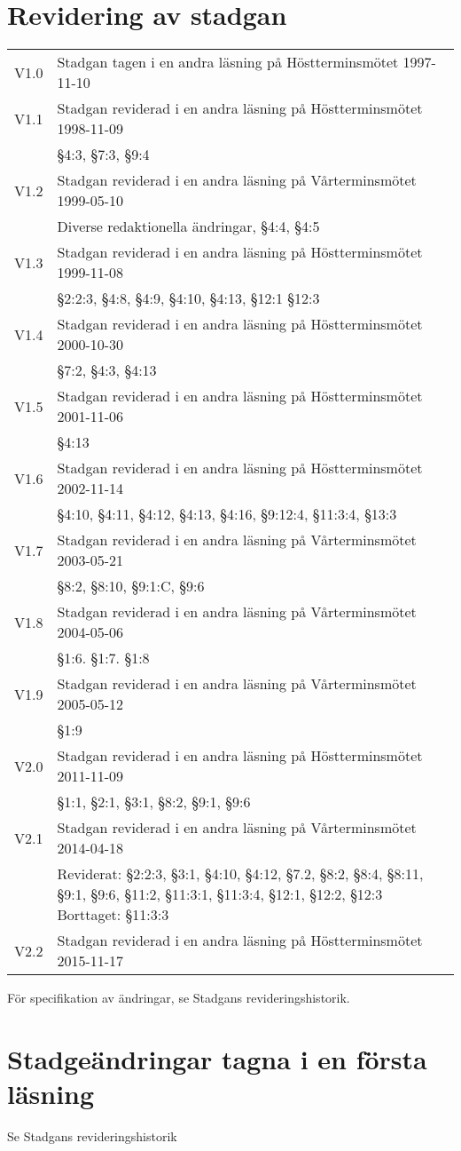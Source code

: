 \documentclass[10pt]{article}
\begin{document}
\newpage
\section*{Revidering av stadgan}

\renewcommand*\arraystretch{1}
\begin{tabular}{p{7mm} p{110mm}}
    V1.0 & Stadgan tagen i en andra läsning på Höstterminsmötet 1997-11-10\\
    V1.1 & Stadgan reviderad i en andra läsning på Höstterminsmötet 1998-11-09\\
    & §4:3, §7:3, §9:4\\
    V1.2 & Stadgan reviderad i en andra läsning på Vårterminsmötet 1999-05-10\\
    & Diverse redaktionella ändringar, §4:4, §4:5 \\
    V1.3 & Stadgan reviderad i en andra läsning på Höstterminsmötet 1999-11-08\\
    & §2:2:3, §4:8, §4:9, §4:10, §4:13, §12:1 §12:3\\
    V1.4 & Stadgan reviderad i en andra läsning på Höstterminsmötet 2000-10-30\\
    & §7:2, §4:3, §4:13\\
    V1.5 & Stadgan reviderad i en andra läsning på Höstterminsmötet 2001-11-06\\
    & §4:13\\
    V1.6 & Stadgan reviderad i en andra läsning på Höstterminsmötet 2002-11-14\\
    & §4:10, §4:11, §4:12, §4:13, §4:16, §9:12:4, §11:3:4, §13:3\\
    V1.7 & Stadgan reviderad i en andra läsning på Vårterminsmötet 2003-05-21\\
    & §8:2, §8:10, §9:1:C, §9:6 \\
    V1.8 & Stadgan reviderad i en andra läsning på Vårterminsmötet 2004-05-06\\
    & §1:6. §1:7. §1:8	\\
    V1.9 & Stadgan reviderad i en andra läsning på Vårterminsmötet 2005-05-12\\
    & §1:9\\
    V2.0 & Stadgan reviderad i en andra läsning på Höstterminsmötet 2011-11-09\\
    & §1:1, §2:1, §3:1, §8:2, §9:1, §9:6\\
     V2.1 & Stadgan reviderad i en andra läsning på Vårterminsmötet 2014-04-18\\
    & Reviderat: §2:2:3, §3:1, §4:10, §4:12, §7.2, §8:2, §8:4, §8:11, §9:1, §9:6, §11:2, §11:3:1,
    §11:3:4, §12:1, §12:2, §12:3
    Borttaget: §11:3:3\\
    V2.2 & Stadgan reviderad i en andra läsning på Höstterminsmötet 2015-11-17\\
\end{tabular}
\renewcommand*\arraystretch{1.3}

För specifikation av ändringar, se Stadgans revideringshistorik.

\section*{Stadgeändringar tagna i en första läsning}

Se Stadgans revideringshistorik
\end{document}
